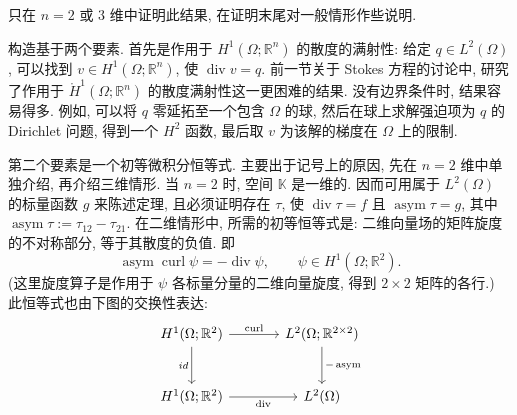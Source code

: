\begin{Proof}
{只在 $n=2$ 或 $3$ 维中证明此结果, 在证明末尾对一般情形作些说明.}

{构造基于两个要素. 首先是作用于 $H^1(\Omega;\mathbb R^n)$ 的散度的满射性: 给定 $q\in L^2(\Omega)$, 可以找到 $v\in H^1(\Omega;\mathbb R^n)$, 使 $\operatorname{div}v=q$. 前一节关于 Stokes 方程的讨论中, 研究了作用于 $\mathring H^1(\Omega;\mathbb R^n)$ 的散度满射性这一更困难的结果. 没有边界条件时, 结果容易得多. 例如, 可以将 $q$ 零延拓至一个包含 $\Omega$ 的球, 然后在球上求解强迫项为 $q$ 的 Dirichlet 问题, 得到一个 $H^2$ 函数, 最后取 $v$ 为该解的梯度在 $\Omega$ 上的限制.}

{第二个要素是一个初等微积分恒等式. 主要出于记号上的原因, 先在 $n=2$ 维中单独介绍, 再介绍三维情形. 当 $n=2$ 时, 空间 $\mathbb K$ 是一维的. 因而可用属于 $L^2(\Omega)$ 的标量函数 $g$ 来陈述定理, 且必须证明存在 $\tau$, 使 $\operatorname{div}\tau=f$ 且 $\operatorname{asym}\tau=g$, 其中 $\operatorname{asym}\tau:=\tau_{12}-\tau_{21}$. 在二维情形中, 所需的初等恒等式是: 二维向量场的矩阵旋度的不对称部分, 等于其散度的负值. 即}
\begin{equation}\label{eq:asym-curl-divergence-identity}
\operatorname{asym}\operatorname{curl}\psi=-\operatorname{div}\psi,\qquad\psi\in H^1(\Omega;\mathbb R^2).
\end{equation}
{(这里旋度算子是作用于 $\psi$ 各标量分量的二维向量旋度, 得到 $2\times2$ 矩阵的各行.) 此恒等式也由下图的交换性表达:}
\[
\begin{tikzcd}[column sep=large,row sep=large]
H^1(\Omega;\mathbb R^2)\arrow[r,"\operatorname{curl}"]\arrow[d,"id"']&L^2(\Omega;\mathbb R^{2\times2})\arrow[d,"-\operatorname{asym}"]\\
H^1(\Omega;\mathbb R^2)\arrow[r,"\operatorname{div}"']&L^2(\Omega)
\end{tikzcd}
\]


\end{Proof}
